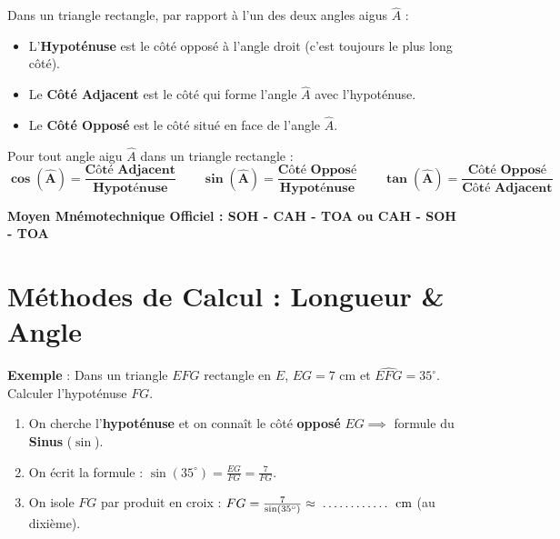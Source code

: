 \begin{cadredef}
Dans un triangle rectangle, par rapport à l'un des deux angles aigus $\widehat{A}$ :
\begin{itemize}[leftmargin=1.5em, itemsep=2pt]
    \item L'\textbf{Hypoténuse} est le côté opposé à l'angle droit (c'est toujours le plus long côté).
    \item Le \textbf{Côté Adjacent} est le côté qui forme l'angle $\widehat{A}$ avec l'hypoténuse.
    \item Le \textbf{Côté Opposé} est le côté situé en face de l'angle $\widehat{A}$.
\end{itemize}
\end{cadredef}

\begin{cadredef}
Pour tout angle aigu $\widehat{A}$ dans un triangle rectangle :
\[ \mathbf{\cos(\widehat{A}) = \frac{\text{Côté Adjacent}}{\text{Hypoténuse}}} \qquad 
   \mathbf{\sin(\widehat{A}) = \frac{\text{Côté Opposé}}{\text{Hypoténuse}}} \qquad 
   \mathbf{\tan(\widehat{A}) = \frac{\text{Côté Opposé}}{\text{Côté Adjacent}}} \]
\end{cadredef}

\begin{center}
\begin{tcolorbox}[colback=colPrimary!10, colframe=colPrimary, width=0.92\linewidth, arc=4pt, boxrule=1pt, top=4pt, bottom=4pt, left=8pt, right=8pt]
\centering\sffamily\bfseries\normalsize
Moyen Mnémotechnique Officiel : \quad \textcolor{colPrimary}{\Large SOH - CAH - TOA} \quad ou \quad \textcolor{colPrimary}{\Large CAH - SOH - TOA}
\end{tcolorbox}
\end{center}

\section{Méthodes de Calcul : Longueur \& Angle}

\begin{cadremethode}
\textbf{Exemple} : Dans un triangle $EFG$ rectangle en $E$, $EG = 7\text{ cm}$ et $\widehat{EFG} = 35^\circ$. Calculer l'hypoténuse $FG$.
\begin{enumerate}[leftmargin=1.5em, itemsep=2pt]
    \item On cherche l'\textbf{hypoténuse} et on connaît le côté \textbf{opposé} $EG \implies$ formule du \textbf{Sinus} ($\sin$).
    \item On écrit la formule : $\sin(35^\circ) = \frac{EG}{FG} = \frac{7}{FG}$.
    \item On isole $FG$ par produit en croix : $FG = \frac{7}{\sin(35^\circ)} \approx \pointille[2cm]\text{ cm}$ (au dixième).
\end{enumerate}
\end{cadremethode}


